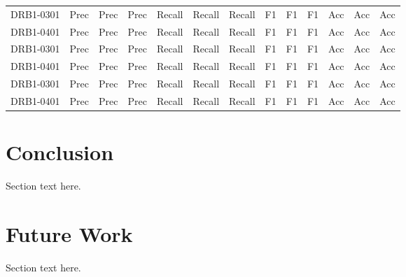 \documentclass[conference,10pt,draftclsnofoot,onecolumn]{IEEEtran}
\begin{document}
\begin{table}[!t]
\begin{tabular}{|c|c|c|c|c|c|c|c|c|c|c|c|c|}
\multirow{1}{*}{DRB1-0301} & Prec & Prec & Prec & Recall & Recall & Recall & F1 & F1 & F1 & Acc & Acc & Acc\\
\cline{2-13}
DRB1-0401 & Prec & Prec & Prec & Recall & Recall & Recall & F1 & F1 & F1 & Acc & Acc & Acc\\
\hline

\multirow{1}{*}{DRB1-0301} & Prec & Prec & Prec & Recall & Recall & Recall & F1 & F1 & F1 & Acc & Acc & Acc\\
\cline{2-13}
DRB1-0401 & Prec & Prec & Prec & Recall & Recall & Recall & F1 & F1 & F1 & Acc & Acc & Acc\\
\hline

\multirow{1}{*}{DRB1-0301} & Prec & Prec & Prec & Recall & Recall & Recall & F1 & F1 & F1 & Acc & Acc & Acc\\
\cline{2-13}
DRB1-0401 & Prec & Prec & Prec & Recall & Recall & Recall & F1 & F1 & F1 & Acc & Acc & Acc\\
\hline
\end{tabular}
\end{table}


\section{Conclusion}
\label{sec:conclusion}
Section text here.

\section{Future Work}
\label{sec:futureWork}
Section text here.


%
%
\end{document}
